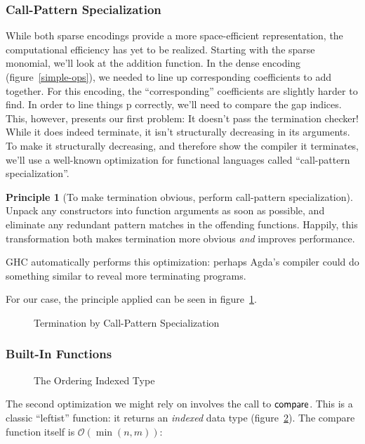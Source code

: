 \documentclass[draft, twocolumn]{article}
\theoremstyle{definition}
\theoremstyle{definition}
\newtheorem{principle}{Principle}[section]
\begin{document}
\subsubsection{Call-Pattern Specialization}
While both sparse encodings provide a more space-efficient representation, the
computational efficiency has yet to be realized. Starting with the sparse
monomial, we'll look at the addition function. In the dense encoding
(figure~\ref{simple-ops}), we needed to line up corresponding coefficients to
add together. For this encoding, the ``corresponding'' coefficients are slightly
harder to find. In order to line things p correctly, we'll need to compare the
gap indices. This, however, presents our first problem:
It doesn't pass the termination checker! While it does indeed terminate, it
isn't structurally decreasing in its arguments. To make it structurally
decreasing, and therefore show the compiler it terminates, we'll use a
well-known optimization for functional languages called ``call-pattern
specialization''\cite{jones_call-pattern_2007}.
\begin{principle}[To make termination obvious, perform call-pattern
    specialization]
  Unpack any constructors into function arguments as soon as possible, and
  eliminate any redundant pattern matches in the offending functions. Happily,
  this transformation both makes termination more obvious \emph{and} improves
  performance.

  GHC automatically performs this optimization: perhaps Agda's compiler could do
  something similar to reveal more terminating programs.
\end{principle}

For our case, the principle applied can be seen in figure~\ref{term-add}.

\begin{figure}
  \centering
  \caption{Termination by Call-Pattern Specialization}
  \label{term-add}
\end{figure}

\subsubsection{Built-In Functions}
\begin{figure}
  \caption{The Ordering Indexed Type}
  \label{ord-type}
\end{figure}
The second optimization we might rely on involves the call to
\(\AgdaFunction{compare}\). This is a classic ``leftist'' function: it returns
an \emph{indexed} data type (figure~\ref{ord-type}). The compare function itself
is \(\mathcal{O}(\min(n, m))\):
\end{document}
